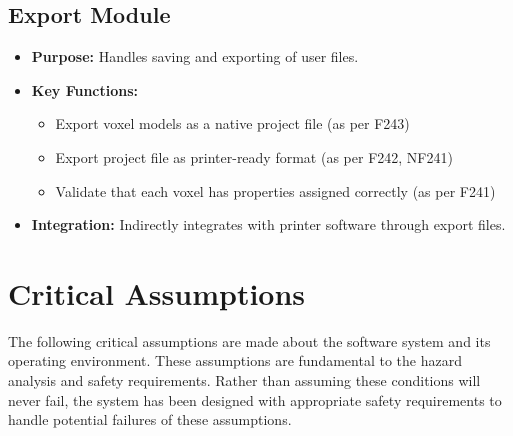 \documentclass{article}
\begin{document}
\subsection{Export Module}
\begin{itemize}
    \item \textbf{Purpose:} Handles saving and exporting of user files.
    \item \textbf{Key Functions:} 
    \begin{itemize}
        \item Export voxel models as a native project file (as per F243)
        \item Export project file as printer-ready format (as per F242, NF241)
        \item Validate that each voxel has properties assigned correctly (as per F241)
    \end{itemize}
    \item \textbf{Integration:} Indirectly integrates with printer software through export files.
\end{itemize}


\section{Critical Assumptions}

The following critical assumptions are made about the software system and its operating environment. These assumptions are fundamental to the hazard analysis and safety requirements. Rather than assuming these conditions will never fail, the system has been designed with appropriate safety requirements to handle potential failures of these assumptions.
\end{document}
